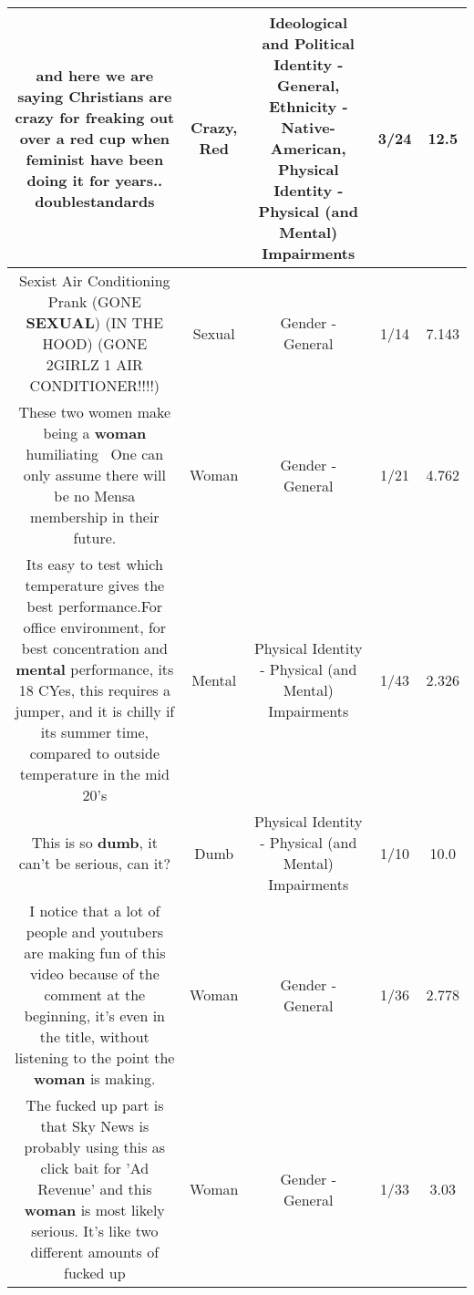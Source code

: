 \documentclass[11pt]{article}
\newlength\mylength
\begin{document}
\begin{center}
\begin{longtable}{|C{.65\mylength}|C{.30\mylength}|C{.12\mylength}|C{.12\mylength}|C{.12\mylength}|}
  \small and here we are saying Christians are \textbf{crazy} for freaking out over a \textbf{r\textbf{ed}} cup when feminist have been doing it for years..  doublestandards\normalsize   & Crazy, Red &  Ideological and Political Identity - General, Ethnicity - Native-American, Physical Identity - Physical (and Mental) Impairments & 3/24 & 12.5 \\  \hline
  \small Sexist Air Conditioning Prank (GONE \textbf{SEXUAL}) (IN THE HOOD) (GONE 2GIRLZ 1 AIR CONDITIONER!!!!)\normalsize   & Sexual & Gender - General & 1/14 & 7.143 \\  \hline
  \small These two women make being a \textbf{woman} humiliating  One can only assume there will be no Mensa membership in their future.\normalsize   & Woman & Gender - General & 1/21 & 4.762 \\  \hline
  \small Its easy to test which temperature gives the best performance.For office environment, for best concentration and \textbf{mental} performance, its 18 CYes, this requires a jumper, and it is chilly if its summer time, compared to outside temperature in the mid 20's\normalsize   & Mental & Physical Identity - Physical (and Mental) Impairments & 1/43 & 2.326 \\  \hline
  \small This is so \textbf{dumb}, it can't be serious, can it?\normalsize   & Dumb & Physical Identity - Physical (and Mental) Impairments & 1/10 & 10.0 \\  \hline
  \small I notice that a lot of people and youtubers are making fun of this video because of the comment at the beginning, it's even in the title, without listening to the point the \textbf{woman} is making.\normalsize   & Woman & Gender - General & 1/36 & 2.778 \\  \hline
  \small The fucked up part is that Sky News is probably using this as click bait for 'Ad Revenue' and this \textbf{woman} is most likely serious. It's like two different amounts of fucked up\normalsize   & Woman & Gender - General & 1/33 & 3.03 \\  \hline

\end{longtable}
\end{center}
\end{document}
